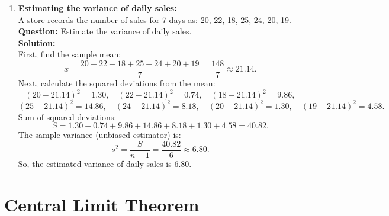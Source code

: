 \documentclass{book}
\begin{document}
\begin{enumerate}[label=Exercise \arabic*:]
    \item \textbf{Estimating the variance of daily sales:} \\
    A store records the number of sales for 7 days as: 20, 22, 18, 25, 24, 20, 19. \\
    \textbf{Question:} Estimate the variance of daily sales. \\
    \textbf{Solution:} \\
    First, find the sample mean:
    \[
    \bar{x} = \frac{20 + 22 + 18 + 25 + 24 + 20 + 19}{7} = \frac{148}{7} \approx 21.14.
    \]
    Next, calculate the squared deviations from the mean:
    \[
    (20 - 21.14)^2 = 1.30, \quad (22 - 21.14)^2 = 0.74, \quad (18 - 21.14)^2 = 9.86,
    \]
    \[
    (25 - 21.14)^2 = 14.86, \quad (24 - 21.14)^2 = 8.18, \quad (20 - 21.14)^2 = 1.30, \quad (19 - 21.14)^2 = 4.58.
    \]
    Sum of squared deviations:
    \[
    S = 1.30 + 0.74 + 9.86 + 14.86 + 8.18 + 1.30 + 4.58 = 40.82.
    \]
    The sample variance (unbiased estimator) is:
    \[
    s^2 = \frac{S}{n-1} = \frac{40.82}{6} \approx 6.80.
    \]
    So, the estimated variance of daily sales is \(\boxed{6.80}\).

\end{enumerate}

\section*{Central Limit Theorem}
\end{document}
